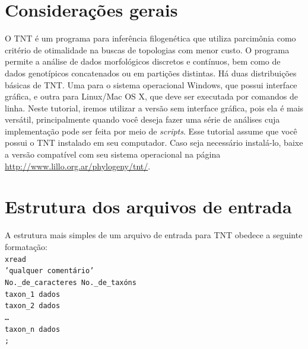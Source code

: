 \newpage
\pagestyle{fancy} %
\begin{refsection}
\renewcommand*{\finalnamedelim}{\addspace\&\space}%

\section{Considerações gerais}\label{tut4:general}

O TNT \parencite{GoloboffEtAl_2008} é um programa para inferência filogenética que utiliza parcimônia como critério de otimalidade na buscas de topologias com menor custo. O programa permite a análise de dados morfológicos discretos e contínuos, bem como de dados genotípicos concatenados ou em partições distintas. Há duas distribuições básicas de TNT. Uma para o sistema operacional Windows, que possui interface gráfica, e outra para Linux/Mac OS X, que deve ser executada por comandos de linha. Neste tutorial, iremos utilizar a versão sem interface gráfica, pois ela é mais versátil, principalmente quando você deseja fazer uma série de análises cuja implementação pode ser feita por meio de \textit{scripts}. Esse tutorial assume que você possui o TNT instalado em seu computador. Caso seja necessário instalá-lo, baixe a versão compatível com seu sistema operacional na página \url{http://www.lillo.org.ar/phylogeny/tnt/}.

\section{Estrutura dos arquivos de entrada}\label{tut4:input}
	A estrutura mais simples de um arquivo de entrada para TNT obedece a seguinte formatação:
\\
\indent\indent\texttt{xread}\\
\indent\indent\texttt{'qualquer comentário'}\\
\indent\indent\texttt{No.\_de\_caracteres  No.\_de\_taxóns}\\
\indent\indent\texttt{taxon\_1   dados}\\
\indent\indent\texttt{taxon\_2   dados}\\
\indent\indent\texttt{…}\\
\indent\indent\texttt{taxon\_n   dados}\\
\indent\indent\texttt{;}\\


\end{refsection}
